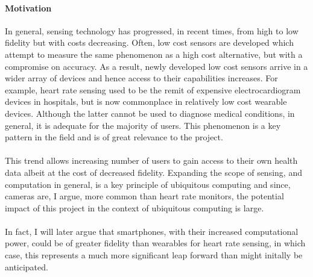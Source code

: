 \paragraph{Motivation}
In general, sensing technology has progressed, in recent times, from high to low fidelity but with costs decreasing.
Often, low cost sensors are developed which attempt to measure the same phenomenon as a high cost alternative, but with a compromise on accuracy.
As a result, newly developed low cost sensors arrive in a wider array of devices and hence access to their capabilities increases.
For example, heart rate sensing used to be the remit of expensive electrocardiogram devices in hospitals, but is now commonplace in relatively low cost wearable devices. Although the latter cannot be used to diagnose medical conditions, in general, it is adequate for the majority of users. This phenomenon
is a key pattern in the field and is of great relevance to the project.
\\\\
This trend allows increasing number of users to gain access to their own health data albeit at the cost of decreased fidelity.
Expanding the scope of sensing, and computation in general, is a key principle of ubiquitous computing and since, cameras are, I argue, more common than heart rate monitors, the potential impact of this project in the context of ubiquitous computing is large. 
\\\\
In fact, I will later argue that smartphones, with their increased computational power, 
could be of greater fidelity than wearables for heart rate sensing, in which case, this represents a much more significant 
leap forward than might initally be anticipated.
